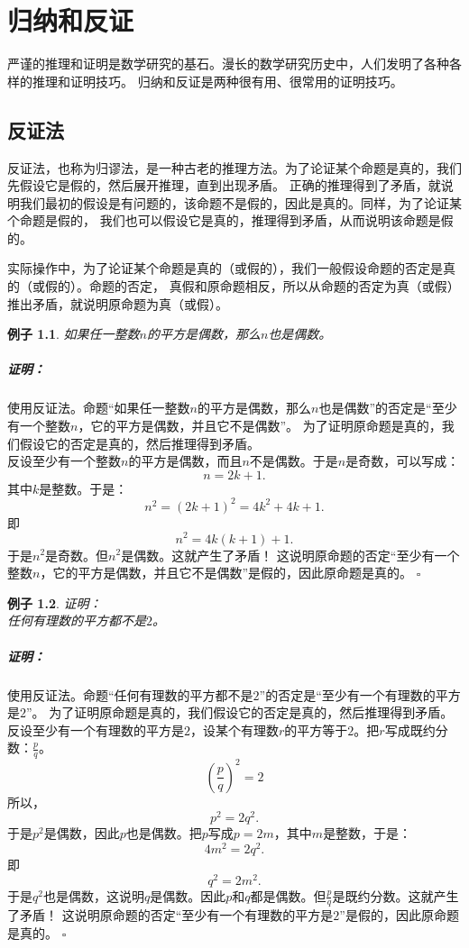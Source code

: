 \documentclass[12pt,UTF8]{ctexbook}
\newtheorem{ex}{例子}[section]
\newenvironment{proof2}{\paragraph{\textbf{证明：}}}{\hfill$\square$}
\begin{document}
\chapter{归纳和反证}
严谨的推理和证明是数学研究的基石。漫长的数学研究历史中，人们发明了各种各样的推理和证明技巧。
归纳和反证是两种很有用、很常用的证明技巧。

\section{反证法}
反证法，也称为归谬法，是一种古老的推理方法。为了论证某个命题是真的，我们先假设它是假的，然后展开推理，直到出现矛盾。
正确的推理得到了矛盾，就说明我们最初的假设是有问题的，该命题不是假的，因此是真的。同样，为了论证某个命题是假的，
我们也可以假设它是真的，推理得到矛盾，从而说明该命题是假的。

实际操作中，为了论证某个命题是真的（或假的），我们一般假设命题的否定是真的（或假的）。命题的否定，
真假和原命题相反，所以从命题的否定为真（或假）推出矛盾，就说明原命题为真（或假）。

\begin{ex}\label{ex:2-0-0}
    如果任一整数$n$的平方是偶数，那么$n$也是偶数。
\end{ex}
\begin{proof2}
    使用反证法。命题“如果任一整数$n$的平方是偶数，那么$n$也是偶数”的否定是“至少有一个整数$n$，它的平方是偶数，并且它不是偶数”。
    为了证明原命题是真的，我们假设它的否定是真的，然后推理得到矛盾。\\
    反设至少有一个整数$n$的平方是偶数，而且$n$不是偶数。于是$n$是奇数，可以写成：
    $$ n = 2k+1.$$
    其中$k$是整数。于是：
    $$ n^2 = (2k+1)^2 = 4k^2 + 4k + 1.$$
    即
    $$ n^2 = 4k(k+1)+1.$$
    于是$n^2$是奇数。但$n^2$是偶数。这就产生了矛盾！
    这说明原命题的否定“至少有一个整数$n$，它的平方是偶数，并且它不是偶数”是假的，因此原命题是真的。
\end{proof2}

\begin{ex}\label{ex:2-0-1}
    证明：\\
    任何有理数的平方都不是$2$。
\end{ex}
\begin{proof2}
    使用反证法。命题“任何有理数的平方都不是$2$”的否定是“至少有一个有理数的平方是$2$”。
    为了证明原命题是真的，我们假设它的否定是真的，然后推理得到矛盾。\\
    反设至少有一个有理数的平方是$2$，设某个有理数$r$的平方等于$2$。把$r$写成既约分数：$\frac{p}{q}$。
    $$ \left(\frac{p}{q}\right)^2 = 2$$
    所以，
    $$ p^2 = 2q^2.$$
    于是$p^2$是偶数，因此$p$也是偶数。把$p$写成$p = 2m$，其中$m$是整数，于是：
    $$ 4m^2 = 2q^2.$$
    即
    $$ q^2 = 2m^2.$$
    于是$q^2$也是偶数，这说明$q$是偶数。因此$p$和$q$都是偶数。但$\frac{p}{q}$是既约分数。这就产生了矛盾！
    这说明原命题的否定“至少有一个有理数的平方是$2$”是假的，因此原命题是真的。
\end{proof2}
\end{document}
